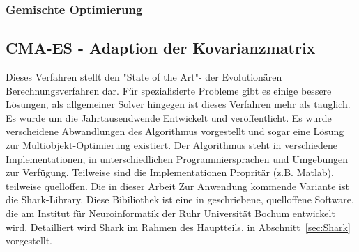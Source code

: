 \subsubsection{Gemischte Optimierung}
%
\lipsum[1]
%
\subsection{CMA-ES - Adaption der Kovarianzmatrix}
%
Dieses Verfahren stellt den "State of the Art"- der Evolutionären Berechnungsverfahren dar. Für spezialisierte Probleme gibt es einige bessere Lösungen, als allgemeiner Solver hingegen ist dieses Verfahren mehr als tauglich. Es wurde um die Jahrtausendwende Entwickelt und veröffentlicht. Es wurde verscheidene Abwandlungen des Algorithmus vorgestellt und sogar eine Lösung zur Multiobjekt-Optimierung existiert. Der Algorithmus steht in verschiedene Implementationen, in unterschiedlichen Programmiersprachen und Umgebungen zur Verfügung. Teilweise sind die Implementationen Propritär (z.B. Matlab), teilweise quelloffen. Die in dieser Arbeit Zur Anwendung kommende Variante ist die Shark-Library. Diese Bibiliothek ist eine in \cpp geschriebene, quelloffene Software, die am Institut für Neuroinformatik der Ruhr Universität Bochum entwickelt wird. Detailliert wird Shark im Rahmen des Hauptteils, in Abschnitt~\ref{sec:Shark} vorgestellt.\\
%
